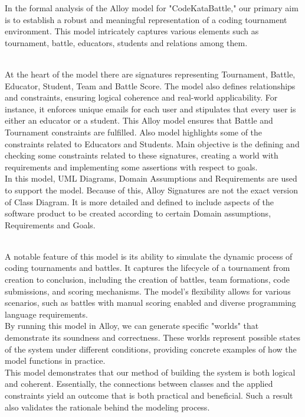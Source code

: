 In the formal analysis of the Alloy model for "CodeKataBattle," our primary aim is to establish a robust and meaningful representation of a coding tournament environment. This model intricately captures various elements such as tournament, battle, educators, students and relations among them.

\\
At the heart of the model there are signatures representing Tournament, Battle, Educator, Student, Team and Battle Score. The model also defines relationships and constraints, ensuring logical coherence and real-world applicability. For instance, it enforces unique emails for each user and stipulates that every user is either an educator or a student. This Alloy model ensures that Battle and Tournament constraints are fulfilled. Also model  highlights some of the constraints related to Educators and Students.  Main objective is the defining and checking some constraints related to these signatures, creating a world with requirements and implementing some assertions with respect to goals.
\\
In this model, UML Diagrams, Domain Assumptions and Requirements are used to support the model. Because of this, Alloy Signatures are not the exact version of Class Diagram. It is more detailed and defined to include aspects of the software product to be created according to certain Domain assumptions, Requirements and Goals. 

\\
A notable feature of this model is its ability to simulate the dynamic process of coding tournaments and battles. It captures the lifecycle of a tournament from creation to conclusion, including the creation of battles, team formations, code submissions, and scoring mechanisms. The model's flexibility allows for various scenarios, such as battles with manual scoring enabled and diverse programming language requirements.
\\
By running this model in Alloy, we can generate specific "worlds" that demonstrate its soundness and correctness. These worlds represent possible states of the system under different conditions, providing concrete examples of how the model functions in practice. 
\\
This model demonstrates that our method of building the system is both logical and coherent. Essentially, the connections between classes and the applied constraints yield an outcome that is both practical and beneficial. Such a result also validates the rationale behind the modeling process.


